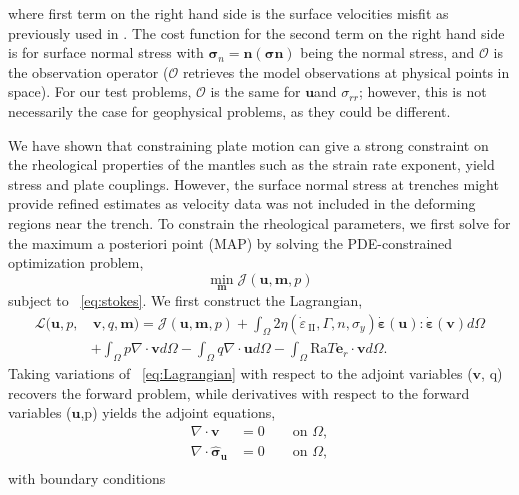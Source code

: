 \documentclass[12pt]{article}
\newcommand{\IIinv}{{\dot\varepsilon}_{\mathrm{\!\!\:II}}}
\newcommand{\mm}{{\ensuremath{\boldsymbol{m}}}}
\newcommand{\uu}{{\ensuremath{\boldsymbol{u}}}}
\newcommand{\vv}{{\ensuremath{\boldsymbol{v}}}}
\newcommand{\ssigma}{{\ensuremath{\boldsymbol{\sigma}}}}
\newcommand{\strain}{{\ensuremath{\dot{\boldsymbol{\varepsilon}}}}}
\begin{document}
where first term on the right hand side is the surface velocities misfit as previously used in \citep{ratnaswamy2015adjoint}. The cost function for the second term on the right hand side is for surface normal stress with $\ssigma_n = \textbf{n}(\ssigma \textbf{n})$ being the normal stress, and $\mathcal{O}$ is the observation operator ($\mathcal{O}$ retrieves the model observations at physical points in space). For our test problems, $\mathcal{O}$ is the same for \uu and $\sigma_{rr}$; however, this is not necessarily the case for geophysical problems, as they could be different.
 
 We have shown that constraining plate motion can give a strong constraint on the rheological properties of the mantles such as the strain rate exponent, yield stress and plate couplings. However, the surface normal stress at trenches might provide refined estimates as velocity data was not included in the deforming regions near the trench. To constrain the rheological parameters, we first
solve for the maximum a posteriori point (MAP) by solving the PDE-constrained optimization problem,
\begin{equation}
\underset{\mm}{\min} \mathcal{J}(\uu,\mm, p)
\end{equation}
subject to ~\eqref{eq:stokes}. We first construct the Lagrangian,
\begin{equation} \label{eq:Lagrangian}
\begin{split}
  \mathcal{L}(\uu,p,&\,\vv,q,\mm)=
  \mathcal{J}(\uu,\mm,p)+\!\!\int_{\Omega}
  \!2\eta(\IIinv,\Gamma, n, \sigma_y)\strain(\uu):\strain(\vv)d\Omega \\&
  +\int_{\Omega} p\nabla \cdot \vv d\Omega - \int_{\Omega} q \nabla \cdot
  \uu d\Omega -\int_{\Omega}\text{Ra}T \textbf{e}_r \cdot \vv d\Omega.
\end{split}
\end{equation}
Taking variations of ~\eqref{eq:Lagrangian} with respect to the adjoint variables (\vv, q) recovers the forward problem, while derivatives with respect to the forward variables (\uu,p) yields the adjoint equations,
\begin{equation}
  \label{eq:adjoint}
  \begin{split}
    \nabla \cdot \vv &=0 \qquad  \text{on } \Omega, \\
    \nabla \cdot \hat \ssigma_\uu&=0  \qquad \text{on } \Omega, \\
  \end{split}
\end{equation}
with boundary conditions 
\end{document}
